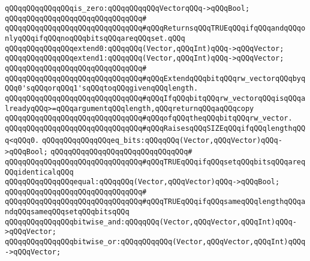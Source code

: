 \newline
\newline
\verb|qQQqqQQqqQQqqQQqis_zero:qQQqqQQqqQQqVectorqQQq->qQQqBool;|\newline
\verb|qQQqqQQqqQQqqQQqqQQqqQQqqQQqqQQq#|\newline
\verb|qQQqqQQqqQQqqQQqqQQqqQQqqQQqqQQq#qQQqReturnsqQQqTRUEqQQqifqQQqandqQQqonlyqQQqifqQQqnoqQQqbitsqQQqareqQQqset.qQQq|\newline
\newline
\verb|qQQqqQQqqQQqqQQqextend0:qQQqqQQq(Vector,qQQqInt)qQQq->qQQqVector;|\newline
\verb|qQQqqQQqqQQqqQQqextend1:qQQqqQQq(Vector,qQQqInt)qQQq->qQQqVector;|\newline
\verb|qQQqqQQqqQQqqQQqqQQqqQQqqQQqqQQq#|\newline
\verb|qQQqqQQqqQQqqQQqqQQqqQQqqQQqqQQq#qQQqExtendqQQqbitqQQqrw_vectorqQQqbyqQQq0'sqQQqorqQQq1'sqQQqtoqQQqgivenqQQqlength.|\newline
\verb|qQQqqQQqqQQqqQQqqQQqqQQqqQQqqQQq#qQQqIfqQQqbitqQQqrw_vectorqQQqisqQQqalreadyqQQq>=qQQqargumentqQQqlength,qQQqreturnqQQqaqQQqcopy|\newline
\verb|qQQqqQQqqQQqqQQqqQQqqQQqqQQqqQQq#qQQqofqQQqtheqQQqbitqQQqrw_vector.|\newline
\verb|qQQqqQQqqQQqqQQqqQQqqQQqqQQqqQQq#qQQqRaisesqQQqSIZEqQQqifqQQqlengthqQQq<qQQq0.|\newline
\newline
\newline
\verb|qQQqqQQqqQQqqQQqeq_bits:qQQqqQQq(Vector,qQQqVector)qQQq->qQQqBool;|\newline
\verb|qQQqqQQqqQQqqQQqqQQqqQQqqQQqqQQq#|\newline
\verb|qQQqqQQqqQQqqQQqqQQqqQQqqQQqqQQq#qQQqTRUEqQQqifqQQqsetqQQqbitsqQQqareqQQqidenticalqQQq|\newline
\newline
\verb|qQQqqQQqqQQqqQQqequal:qQQqqQQq(Vector,qQQqVector)qQQq->qQQqBool;|\newline
\verb|qQQqqQQqqQQqqQQqqQQqqQQqqQQqqQQq#|\newline
\verb|qQQqqQQqqQQqqQQqqQQqqQQqqQQqqQQq#qQQqTRUEqQQqifqQQqsameqQQqlengthqQQqandqQQqsameqQQqsetqQQqbitsqQQq|\newline
\newline
\verb|qQQqqQQqqQQqqQQqbitwise_and:qQQqqQQq(Vector,qQQqVector,qQQqInt)qQQq->qQQqVector;|\newline
\verb|qQQqqQQqqQQqqQQqbitwise_or:qQQqqQQqqQQq(Vector,qQQqVector,qQQqInt)qQQq->qQQqVector;|\newline
